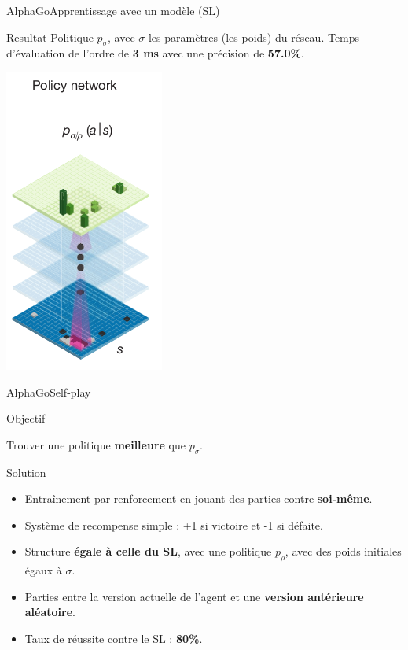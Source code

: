 \begin{frame}{AlphaGo}{Apprentissage avec un modèle (SL)}
    \begin{block}{Resultat}
        Politique $p_\sigma$, avec $\sigma$ les paramètres (les poids) du réseau.
        Temps d'évaluation de l'ordre de \textbf{3 ms} avec une précision de \textbf{57.0\%}.
    \end{block}
    \begin{center}
        \includegraphics[scale=0.4]{ressources/AlphaGo/Policy_Network}
    \end{center}
\end{frame}

\begin{frame}{AlphaGo}{Self-play}
    \begin{block}{Objectif}
        \begin{center}
            Trouver une politique \textbf{meilleure} que $p_\sigma$.
        \end{center}
    \end{block}

    \begin{block}{Solution}
        \begin{itemize}
            \item Entraînement par renforcement en jouant des parties contre \textbf{soi-même}.
            \item Système de recompense simple : +1 si victoire et -1 si défaite.
            \item Structure \textbf{égale à celle du SL}, avec une politique $p_\rho$, avec des poids initiales égaux à $\sigma$.
            \item Parties entre la version actuelle de l'agent et une \textbf{version antérieure aléatoire}.
            \item Taux de réussite contre le SL : \textbf{80\%}.
        \end{itemize}
    \end{block}
\end{frame}


